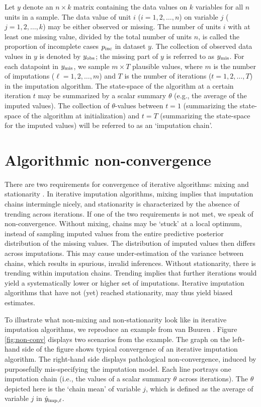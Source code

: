 \documentclass[Royal,times,sageh]{sagej}
\begin{document}
Let \(y\) denote an \(n \times k\) matrix containing the data values on \(k\) variables for all \(n\) units in a sample. The data value of unit \(i\) (\(i = 1, 2, \dots, n\)) on variable \(j\) (\(j = 1, 2, \dots, k\)) may be either observed or missing. The number of units \(i\) with at least one missing value, divided by the total number of units \(n\), is called the proportion of incomplete cases \(p_{\rm inc}\) in dataset \(y\). The collection of observed data values in \(y\) is denoted by \(y_{\rm obs}\); the missing part of \(y\) is referred to as \(y_{\rm mis}\). For each datapoint in \(y_{\rm mis}\), we sample \(m \times T\) plausible values, where \(m\) is the number of imputations (\(\ell = 1, 2, \dots, m\)) and \(T\) is the number of iterations (\(t = 1, 2, \dots, T\)) in the imputation algorithm. The state-space of the algorithm at a certain iteration \(t\) may be summarized by a scalar summary \(\theta\) (e.g., the average of the imputed values). The collection of \(\theta\)-values between \(t=1\) (summarizing the state-space of the algorithm at initialization) and \(t=T\) (summarizing the state-space for the imputed values) will be referred to as an `imputation chain'.

\hypertarget{algorithmic-non-convergence}{%
\section{Algorithmic non-convergence}\label{algorithmic-non-convergence}}

There are two requirements for convergence of iterative algorithms: mixing and stationarity \citep{gelm13}. In iterative imputation algorithms, mixing implies that imputation chains intermingle nicely, and stationarity is characterized by the absence of trending across iterations. If one of the two requirements is not met, we speak of non-convergence. Without mixing, chains may be `stuck' at a local optimum, instead of sampling imputed values from the entire predictive posterior distribution of the missing values. The distribution of imputed values then differs across imputations. This may cause under-estimation of the variance between chains, which results in spurious, invalid inferences. Without stationarity, there is trending within imputation chains. Trending implies that further iterations would yield a systematically lower or higher set of imputations. Iterative imputation algorithms that have not (yet) reached stationarity, may thus yield biased estimates.

To illustrate what non-mixing and non-stationarity look like in iterative imputation algorithms, we reproduce an example from van Buuren \citeyearpar[\(\S\) 6.5.2]{buur18}. Figure \ref{fig:non-conv} displays two scenarios from the example. The graph on the left-hand side of the figure shows typical convergence of an iterative imputation algorithm. The right-hand side displays pathological non-convergence, induced by purposefully mis-specifying the imputation model. Each line portrays one imputation chain (i.e., the values of a scalar summary \(\theta\) across iterations). The \(\theta\) depicted here is the `chain mean' of variable \(j\), which is defined as the average of variable \(j\) in \(\dot y_{\rm imp, \ell}\).
\end{document}
